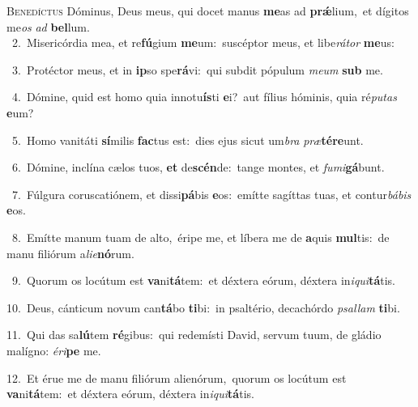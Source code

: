 \lettrine{\initial\textcolor{\initialcolor}{B}}{enedíctus} Dóminus, Deus meus, qui docet manus \textbf{me}\-as ad \textbf{prǽ}\-lium,~\star et dígitos me\textit{os} \textit{ad} \textbf{bel}\-lum.\\
{\numbfont\textcolor{\numbcolor}{~2.}}~Misericórdia mea, et re\-\textbf{fú}\-gium \textbf{me}\-um:~\star suscéptor meus, et libe\-\textit{rá}\-\textit{tor} \textbf{me}\-us:\par
{\numbfont\textcolor{\numbcolor}{~3.}}~Protéctor meus, et in \textbf{ip}\-so spe\-\textbf{rá}\-vi:~\star qui subdit pópulum \textit{me}\-\textit{um} \textbf{sub} me.\par
{\numbfont\textcolor{\numbcolor}{~4.}}~Dómine, quid est homo quia innotu\-\textbf{ís}\-ti \textbf{e}\-i?~\star aut fílius hóminis, quia ré\-\textit{pu}\-\textit{tas} \textbf{e}\-um?\par
{\numbfont\textcolor{\numbcolor}{~5.}}~Homo vanitáti \textbf{sí}\-milis \textbf{fac}\-tus est:~\star dies ejus sicut um\textit{bra} \textit{præ}\-\textbf{tér}\textbf{e}unt.\par
{\numbfont\textcolor{\numbcolor}{~6.}}~Dómine, inclína cælos tuos, \textbf{et} de\-\textbf{scén}\-de:~\star tange montes, et \textit{fu}\-\textit{mi}\textbf{gá}bunt.\par
{\numbfont\textcolor{\numbcolor}{~7.}}~Fúlgura coruscatiónem, et dissi\-\textbf{pá}\-bis \textbf{e}\-os:~\star emítte sagíttas tuas, et contur\-\textit{bá}\-\textit{bis} \textbf{e}\-os.\par
{\numbfont\textcolor{\numbcolor}{~8.}}~Emítte manum tuam de alto,~\dagger éripe me, et líbera me de \textbf{a}\-quis \textbf{mul}\-tis:~\star de manu filiórum a\-\textit{li}\-\textit{e}\textbf{nó}rum.\par
{\numbfont\textcolor{\numbcolor}{~9.}}~Quorum os locútum est \textbf{va}\-ni\-\textbf{tá}\-tem:~\star et déxtera eórum, déxtera in\-\textit{i}\-\textit{qui}\textbf{tá}tis.\par
{\numbfont\textcolor{\numbcolor}{10.}}~Deus, cánticum novum can\-\textbf{tá}\-bo \textbf{ti}\-bi:~\star in psaltério, decachórdo \textit{psal}\-\textit{lam} \textbf{ti}\-bi.\par
{\numbfont\textcolor{\numbcolor}{11.}}~Qui das sa\-\textbf{lú}\-tem \textbf{ré}\-gibus:~\star qui redemísti David, servum tuum, de gládio malígno: \textit{é}\-\textit{ri}\textbf{pe} me.\par
{\numbfont\textcolor{\numbcolor}{12.}}~Et érue me de manu filiórum alienórum,~\dagger quorum os locútum est \textbf{va}\-ni\-\textbf{tá}\-tem:~\star et déxtera eórum, déxtera in\-\textit{i}\-\textit{qui}\textbf{tá}tis.\par
